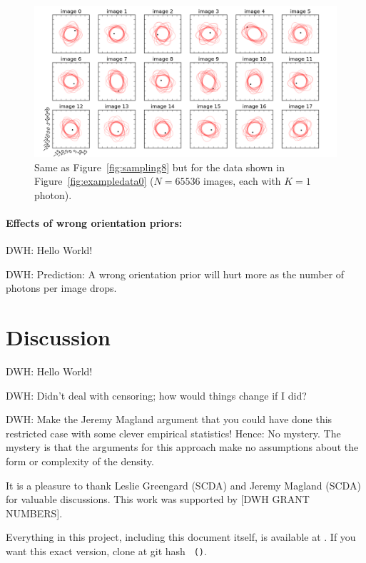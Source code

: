\documentclass[12pt]{article}
\newcommand{\hoggcaption}[1]{\caption{\textsf{#1}}}
\renewcommand{\figurename}{\textsf{Figure}}
\begin{document}
\begin{figure}[!tbp]
\includegraphics[width=\textwidth]{sampling_16_00.png}
\hoggcaption{Same as \figurename~\ref{fig:sampling8} but for the data shown in
  \figurename~\ref{fig:exampledata0}
  ($N=65536$ images, each with $K=1$ photon).\label{fig:sampling0}}
\end{figure}

\paragraph{Effects of wrong orientation priors:}
DWH: Hello World!

DWH: Prediction: A wrong orientation prior will hurt more as the
number of photons per image drops.

\section{Discussion}

DWH: Hello World!

DWH: Didn't deal with censoring; how would things change if I did?

DWH: Make the Jeremy Magland argument that you could have done this
restricted case with some clever empirical statistics!  Hence: No
mystery.  The mystery is that the arguments for this approach make no
assumptions about the form or complexity of the density.

\bigskip

It is a pleasure to thank Leslie Greengard (SCDA) and Jeremy Magland
(SCDA) for valuable discussions.
This work was supported by [DWH GRANT NUMBERS].

Everything in this project, including this document itself, is
available at \giturl.  If you want this exact version, clone at git
hash \texttt{\githash\,(\gitdate)}.
\end{document}
